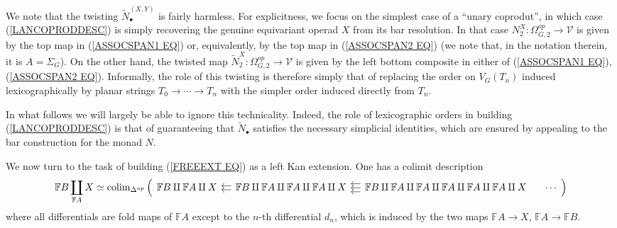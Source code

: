 \documentclass[a4paper,10pt]{article}%
\begin{document}
\begin{remark}
  We note that the twisting $\tilde{N}_{\bullet}^{(X,Y)}$ is fairly harmless. 
  For explicitness, we focus on the simplest case of a ``unary coprodut'', in which case (\ref{LANCOPRODDESC})
  is simply recovering the genuine equivariant operad $X$ from its bar resolution. 
  In that case $N^X_2 \colon \Omega_{G,2}^{op} \to \mathcal{V}$
  is given by the top map in 
  (\ref{ASSOCSPAN1 EQ}) or, equivalently, by the top map in 
  (\ref{ASSOCSPAN2 EQ}) (we note that, in the notation therein, it is $A=\Sigma_G$). On the other hand, the twisted map
  $\tilde{N}^X_2 \colon \Omega_{G,2}^{op} \to \mathcal{V}$
  is given by the left bottom composite in either of (\ref{ASSOCSPAN1 EQ}), (\ref{ASSOCSPAN2 EQ}).
  Informally, the role of this twisting is therefore simply that of replacing the order on $V_G(T_n)$ induced lexicographically by planar strings 
  $T_0 \to \cdots \to T_n$
  with the simpler order induced directly from $T_n$.

  In what follows we will largely be able to ignore this technicality. Indeed, the role of lexicographic orders
  in building (\ref{LANCOPRODDESC}) is that of guaranteeing that 
  $\tilde{N}_{\bullet}$ satisfies the necessary simplicial identities, which are ensured by appealing to the bar construction for the monad $N$.
\end{remark}


We now turn to the task of building (\ref{FREEEXT EQ})
as a left Kan extension. One has a colimit description
\begin{equation}\label{FREEEXTUSEFCOL EQ}
  \mathbb{F} B \coprod_{\mathbb{F} A} X
  \simeq
  \colim_{\Delta^{op}} \left(
    \begin{tikzcd}[column sep = 1em]
      \mathbb{F} B \amalg \mathbb{F} A \amalg X &
      \mathbb{F} B \amalg \mathbb{F} A \amalg \mathbb{F} A \amalg \mathbb{F} A  \amalg X
      \ar[l,shift left=2pt] \ar[l,shift left=-2pt] &	
      \mathbb{F} B \amalg \mathbb{F} A \amalg \mathbb{F} A \amalg \mathbb{F} A \amalg \mathbb{F} A \amalg \mathbb{F} A  \amalg X
      \ar[l,shift left=4pt] \ar[l,shift left=-4pt]  \ar[l] &
      \cdots
    \end{tikzcd}
  \right)
\end{equation}
where all differentials are fold maps of $\mathbb{F} A$ except to the $n$-th differential $d_n$, which is induced by the two maps $\mathbb{F}A \to X$, $\mathbb{F}A \to \mathbb{F}B$.
\end{document}
